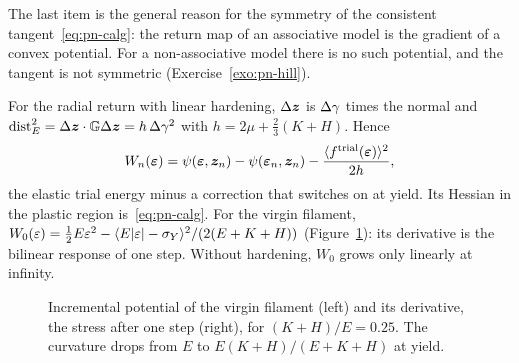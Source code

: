 The last item is the general reason for the symmetry of the consistent
tangent~\eqref{eq:pn-calg}: the return map of an associative model is the
gradient of a convex potential. For a non-associative model there is no such
potential, and the tangent is not symmetric (Exercise~\ref{exo:pn-hill}).

\begin{example}\label{ex:pn-WJ2}
For the radial return with linear hardening, $\Delta\bm{z}$ is $\Delta\gamma$ times the
normal and $\mathrm{dist}_E^2=\Delta\bm{z}\cdot\mathbb{G}\Delta\bm{z}=h\,\Delta\gamma^2$ with
$h=2\mu+\tfrac23(K+H)$. Hence
\begin{equation}\label{eq:pn-WJ2}
  W_n(\bm{\varepsilon})=\psi(\bm{\varepsilon},\bm{z}_n)-\psi(\bm{\varepsilon}_n,\bm{z}_n)-\frac{\langle f^{\mathrm{trial}}(\bm{\varepsilon})\rangle^2}{2h} ,
\end{equation}
the elastic trial energy minus a correction that switches on at yield. Its
Hessian in the plastic region is~\eqref{eq:pn-calg}. For the virgin filament,
$W_0(\varepsilon)=\tfrac12E\varepsilon^2-\langle E|\varepsilon|-\sigma_{Y}\rangle^2/(2(E+K+H))$
(Figure~\ref{fig:pn-W1d}): its derivative is the bilinear response of one
step. Without hardening, $W_0$ grows only linearly at infinity.
\end{example}

\begin{figure}[h]
\centering
{}
\caption{Incremental potential of the virgin filament (left) and its
derivative, the stress after one step (right), for $(K+H)/E=0.25$. The
curvature drops from $E$ to $E(K+H)/(E+K+H)$ at yield.}
\label{fig:pn-W1d}
\end{figure}

